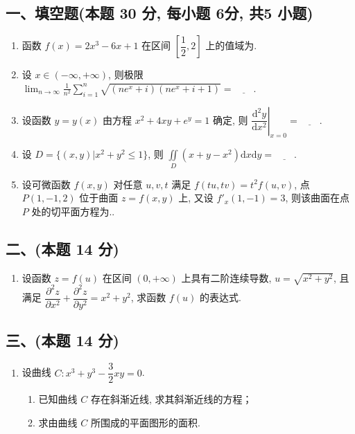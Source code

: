 \subsection*{一、填空题(本题 30 分,  每小题 6分,  共5 小题)}
\begin{enumerate}
    \item 函数 $f(x) = 2x^3 - 6x + 1$ 在区间 $\left[ \dfrac{1}{2},  2 \right]$ 上的值域为\underline{\quad\quad}.
    \item 设 $x \in (-\infty,  +\infty)$, 则极限 $\displaystyle \lim_{n \to \infty} \frac{1}{n^2} \sum_{i=1}^n \sqrt{(ne^x + i)(ne^x + i + 1)} = \underline{\quad\quad}. $
    \item 设函数 $y = y(x)$ 由方程 $x^2 + 4xy + e^y = 1$ 确定, 则 $ \left. \dfrac{\mathrm{d}^2 y}{\mathrm{d}x^2} \right|_{x=0} = \underline{\quad\quad}. $
    \item 设 $D = \{(x,  y)| x^2 + y^2 \leq 1 \}$, 则 $ \displaystyle\iint\limits_D (x + y - x^2) \mathrm{d}x\mathrm{d}y = \underline{\quad\quad}. $
    \item 设可微函数 $f(x,  y)$ 对任意 $u,  v,  t$ 满足 $f(tu,  tv) = t^2 f(u,  v)$, 点 $P(1,  -1,  2)$ 位于曲面 $z = f(x,  y)$ 上, 又设 $f'_x(1,  -1) = 3$, 则该曲面在点 $P$ 处的切平面方程为\underline{\quad\quad}..
\end{enumerate}

\subsection*{二、(本题 14 分)}
\begin{enumerate}[start=6]
    \item 设函数 $z = f(u)$ 在区间 $(0,  +\infty)$ 上具有二阶连续导数, $u = \sqrt{x^2 + y^2}$, 且满足 $\dfrac{\partial^2 z}{\partial x^2} + \dfrac{\partial^2 z}{\partial y^2} = x^2 + y^2$, 求函数 $f(u)$ 的表达式.
\end{enumerate}

\subsection*{三、(本题 14 分)}
\begin{enumerate}[start=7]
    \item 设曲线 $C: x^3 + y^3 - \dfrac{3}{2}xy = 0$.
          \begin{enumerate}
              \item [(1)] 已知曲线 $C$ 存在斜渐近线, 求其斜渐近线的方程；
              \item [(2)] 求由曲线 $C$ 所围成的平面图形的面积.
          \end{enumerate}
\end{enumerate}

